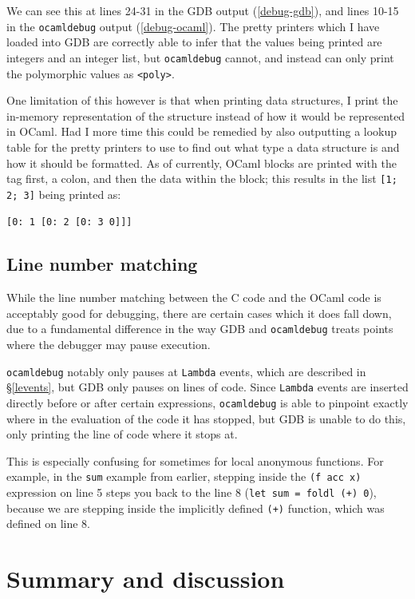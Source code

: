 We can see this at lines 24-31 in the GDB output (\ref{debug-gdb}), and 
lines 10-15 in the \texttt{ocamldebug} output (\ref{debug-ocaml}). The 
pretty printers which I have loaded into GDB are correctly able to infer that 
the values being printed are integers and an integer list, but 
\texttt{ocamldebug} cannot, and instead can only print the polymorphic values 
as \texttt{<poly>}.

One limitation of this however is that when printing data structures, I print 
the in-memory representation of the structure instead of how it would be 
represented in OCaml. Had I more time this could be remedied by also outputting 
a lookup table for the pretty printers to use to find out what type a data 
structure is and how it should be formatted. As of currently, OCaml blocks are 
printed with the tag first, a colon, and then the data within the block; this 
results in the list \texttt{[1; 2; 3]} being printed as: 

\verb|[0: 1 [0: 2 [0: 3 0]]]|

\subsection{Line number matching}

While the line number matching between the C code and the OCaml code is 
acceptably good for debugging, there are certain cases which it does fall down, 
due to a fundamental difference in the way GDB and \texttt{ocamldebug} treats 
points where the debugger may pause execution.

\texttt{ocamldebug} notably only pauses at \texttt{Lambda} events, which are
described in \S\ref{levents}, but GDB only pauses on lines of code. Since
\texttt{Lambda} events are inserted directly before or after certain
expressions, \texttt{ocamldebug} is able to pinpoint exactly where in the
evaluation of the code it has stopped, but GDB is unable to do this, only
printing the line of code where it stops at.

This is especially confusing for sometimes for local anonymous functions. For 
example, in the \texttt{sum} example from earlier, stepping inside the 
\texttt{(f acc x)} expression on line 5 steps you back to the line 8 
(\texttt{let sum = foldl (+) 0}), because we are stepping inside the implicitly 
defined \texttt{(+)} function, which was defined on line 8.

\section{Summary and discussion}

